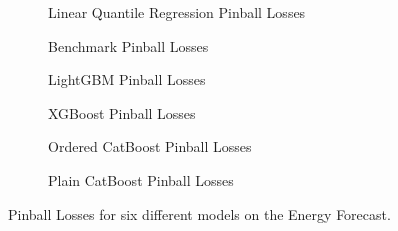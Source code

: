 \begin{figure}[htbp]
    \centering
    \begin{subfigure}[b]{0.5\textwidth}
        \centering
        
        \caption{Linear Quantile Regression Pinball Losses}
        \label{fig:small-orfe-pinball-energy}
    \end{subfigure}%
    \begin{subfigure}[b]{0.5\textwidth}
        \centering
        
        \caption{Benchmark Pinball Losses}
        \label{fig:armed-play-pinball-energy}
    \end{subfigure}
    
    \begin{subfigure}[b]{0.5\textwidth}
        \centering
        
        \caption{LightGBM Pinball Losses}
        \label{fig:mangy-flux-pinball-energy}
    \end{subfigure}%
    \begin{subfigure}[b]{0.5\textwidth}
        \centering
        
        \caption{XGBoost Pinball Losses}
        \label{fig:couth-ruby-pinball-energy}
    \end{subfigure}
    
    \begin{subfigure}[b]{0.5\textwidth}
        \centering
        
        \caption{Ordered CatBoost Pinball Losses}
        \label{fig:civil-leas-pinball-energy}
    \end{subfigure}%
    \begin{subfigure}[b]{0.5\textwidth}
        \centering
        
        \caption{Plain CatBoost Pinball Losses}
        \label{fig:blear-dita-pinball-energy}
    \end{subfigure}
    
    \caption{Pinball Losses for six different models on the Energy Forecast.}
    \label{fig:energy_pinball}
\end{figure}

